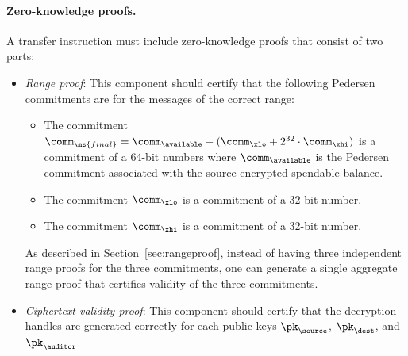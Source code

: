 \newcommand{\final}{\ms{final}}

\paragraph{Zero-knowledge proofs.}
A transfer instruction must include zero-knowledge proofs that consist of two
parts:
\begin{itemize}
  \item \emph{Range proof}: This component should certify that the following
    Pedersen commitments are for the messages of the correct range:
    \begin{itemize}
      \item The commitment $\comm_{\final} = \comm_{\available} - (\comm_{\xlo} +
        2^{32} \cdot \comm_{\xhi})$ is a commitment of a 64-bit numbers where
        $\comm_{\available}$ is the Pedersen commitment associated with the
        source encrypted spendable balance.

      \item The commitment $\comm_{\xlo}$ is a commitment of a 32-bit number.

      \item The commitment $\comm_{\xhi}$ is a commitment of a 32-bit number.
    \end{itemize}
    As described in Section~\ref{sec:rangeproof}, instead of having three
    independent range proofs for the three commitments, one can generate a
    single aggregate range proof that certifies validity of the three
    commitments.

  \item \emph{Ciphertext validity proof}: This component should certify that the
    decryption handles are generated correctly for each public keys
    $\pk_\source$, $\pk_\dest$, and $\pk_\auditor$.

\end{itemize}

